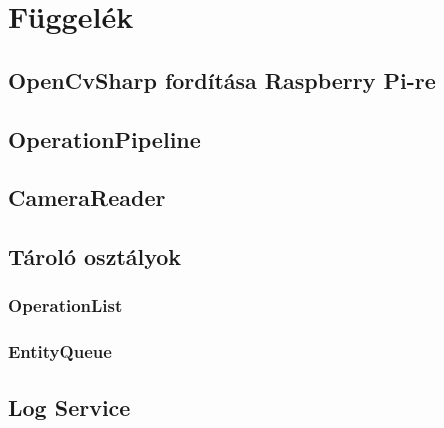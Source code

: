 \appendix

\chapter*{Függelék}

\setcounter{chapter}{6}     %

\newpage


\section{OpenCvSharp fordítása Raspberry Pi-re}

\section{OperationPipeline}

\section{CameraReader}

\section{Tároló osztályok}
\subsection{OperationList}

\subsection{EntityQueue}

\section{Log Service}
